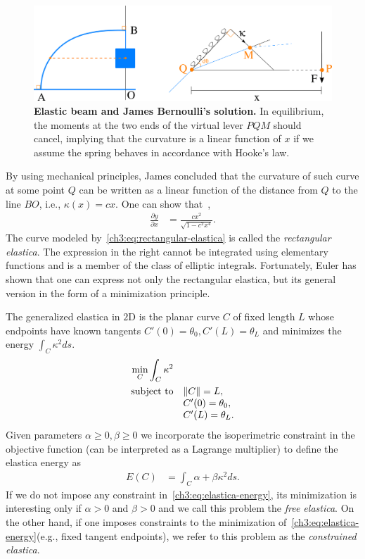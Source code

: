 \begin{figure}
\center
\includegraphics[scale=0.36]{figures/chapter3/elastica/james-scheme.png}
\caption{\textbf{Elastic beam and James Bernoulli's solution.} In equilibrium, the moments at the two ends of the virtual lever $PQM$ should cancel, implying that the curvature is a linear function of $x$ if we assume the spring behaves in accordance with Hooke's law.}
\label{ch3:fig:james-scheme-elastica}
\end{figure}

By using mechanical principles, James concluded that the curvature of such curve at some point $Q$ can be written as a linear function of the distance from $Q$ to the line $BO$, i.e., $\kappa(x) = cx$. One can show that~\cite{levien08elastica,truesdell60rational},
\begin{align}
	\frac{\partial y}{\partial x} &= \frac{cx^2}{ \sqrt{1-c^2x^4} }.
	\label{ch3:eq:rectangular-elastica}
\end{align}
%
The curve modeled by~\cref{ch3:eq:rectangular-elastica} is called the \emph{rectangular elastica}. The expression in the right cannot be integrated using elementary functions and is a member of the class of elliptic integrals. Fortunately, Euler has shown that one can express not only the rectangular elastica, but its general version in the form of a minimization principle. 

The generalized elastica in $2$D is the planar curve $C$ of fixed length $L$ whose endpoints have known tangents $C'(0)=\theta_0,C'(L)=\theta_L$ and minimizes the energy $\int_{C} \kappa^2 ds$.
\begin{align*}
	\begin{array}{rl}
		\displaystyle \min_{C} \int_{C}{\kappa ^2} \\[1em]
		\text{subject to}& \lVert C\rVert = L,\\
		& C'(0) = \theta_0, \\
		& C'(L) = \theta_L.
	\end{array}	
\end{align*}
%
Given parameters $\alpha \geq 0, \beta \geq 0$ we incorporate the isoperimetric constraint in the objective function (can be interpreted as a Lagrange multiplier) to define the elastica energy as
\begin{align}
	E(C) &= \int_{C}{\alpha + \beta \kappa^2 ds}.
	\label{ch3:eq:elastica-energy}
\end{align}
%
If we do not impose any constraint in~\cref{ch3:eq:elastica-energy}, its minimization is interesting only if $\alpha >0$ and $\beta >0$ and we call this problem the \emph{free elastica}. On the other hand, if one imposes constraints to the minimization of~\cref{ch3:eq:elastica-energy}(e.g., fixed tangent endpoints), we refer to this problem as the \emph{constrained elastica}.

